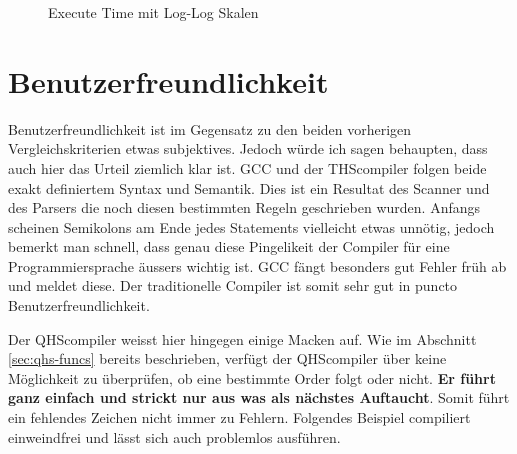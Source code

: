 \begin{figure}[h!]
\centering
{}
\caption{Execute Time mit Log-Log Skalen}
\end{figure}


\section{Benutzerfreundlichkeit}
Benutzerfreundlichkeit ist im Gegensatz zu den beiden vorherigen Vergleichskriterien etwas subjektives. Jedoch würde ich sagen behaupten, dass auch hier das Urteil ziemlich klar ist.
GCC und der THScompiler folgen beide exakt definiertem Syntax und Semantik. Dies ist ein Resultat des Scanner und des Parsers die noch diesen bestimmten Regeln geschrieben wurden.
Anfangs scheinen Semikolons am Ende jedes Statements vielleicht etwas unnötig, jedoch bemerkt man schnell, dass genau diese Pingelikeit der Compiler für eine Programmiersprache äussers wichtig ist.
GCC fängt besonders gut Fehler früh ab und meldet diese. Der traditionelle Compiler ist somit sehr gut in puncto Benutzerfreundlichkeit.

Der QHScompiler weisst hier hingegen einige Macken auf. Wie im Abschnitt \ref{sec:qhs-funcs} bereits beschrieben, verfügt der QHScompiler über keine Möglichkeit zu überprüfen, ob eine bestimmte Order folgt oder nicht.
\textbf{Er führt ganz einfach und strickt nur aus was als nächstes Auftaucht}. Somit führt ein fehlendes Zeichen nicht immer zu Fehlern. Folgendes Beispiel compiliert einweindfrei und lässt sich auch problemlos ausführen.

